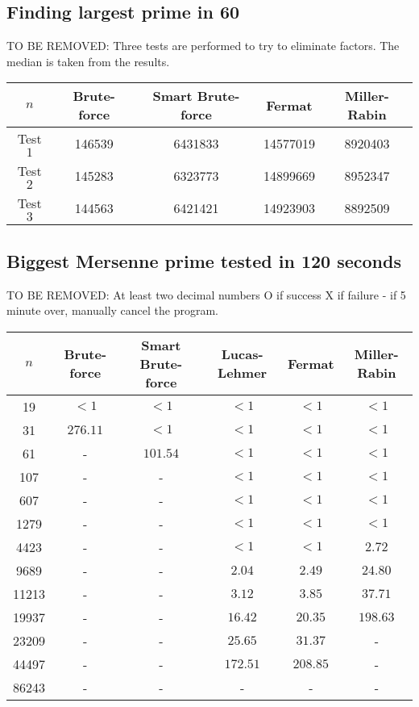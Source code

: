 \documentclass[main.tex]{subfiles}
\begin{document}
\subsection{Finding largest prime in 60 }

TO BE REMOVED:
Three tests are performed to try to eliminate factors. The median is taken from
the results.

\begin{table}[ht!]
  \centering
  \begin{tabular}{||c | c c c c||}
    \hline
    $n$ & Brute-force & Smart Brute-force & Fermat & Miller-Rabin \\ [0.5ex] 
    \hline\hline
    Test $1$ & 146539 & 6431833 & 14577019 & 8920403\\ 
    Test $2$ & 145283 & 6323773 & 14899669 & 8952347\\ 
    Test $3$ & 144563 & 6421421 & 14923903 & 8892509\\   [1ex] 
    \hline
  \end{tabular}
\end{table}

\subsection{Biggest Mersenne prime tested in 120 seconds}

TO BE REMOVED:
At least two decimal numbers O if success X if failure - if 5 minute over,
manually cancel the program.

\begin{table}[ht!]
  \centering
  \begin{tabular}{||c | c c c c c||}
    \hline
    $n$ & Brute-force & Smart Brute-force & Lucas-Lehmer & Fermat & Miller-Rabin  \\ [0.5ex] 
    \hline\hline
    19 & $<1$  & $<1$  & $<1$  & $<1$  & $<1$ \\
    31 & $276.11$ & $<1$  & $<1$  & $<1$  & $<1 $\\
    61 & - & $101.54$  & $<1$  & $<1$  & $<1$ \\
    107 & - & - & $<1$ & $<1$  & $<1$ \\
    607 & - & - & $<1$  & $<1$  & $<1$ \\
    1279 & - & - & $<1$  & $<1$  & $<1$ \\
    4423 & - & - & $<1$  & $<1$  & $2.72$ \\
    9689 & - & - & $2.04$  & $2.49$  & $24.80$ \\
    11213 & - & - & $3.12$  & $3.85$  & $37.71$ \\
    19937 & - & - & $16.42$  & $20.35$  &  $198.63$ \\
    23209 & - & - & $25.65$ & $31.37$  & -\\ 
    44497 & - & - &  $172.51$  &  $208.85$  & -\\ 
    86243 & - & - & - & - & -\\  [1ex] 
    \hline
  \end{tabular}
\end{table}
\end{document}
